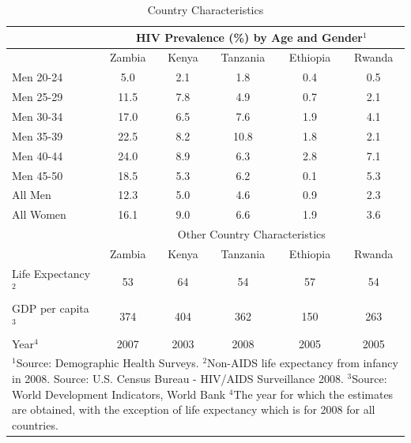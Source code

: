 \documentclass[12pt]{article}
\begin{document}
\begin{table}
\begin{center}
\caption{Country Characteristics}\label{tb:countries}
\vspace*{1pc}
\begin{tabular}{l|ccccc}\hline\hline
 & \multicolumn{5}{c}{HIV Prevalence (\%) by Age and Gender$^{1}$} \\\hline
 & Zambia & Kenya & Tanzania & Ethiopia & Rwanda \\\hline
Men 20-24 & 5.0   & 2.1  & 1.8  & 0.4  & 0.5  \\
Men 25-29 & 11.5  & 7.8  & 4.9  & 0.7  & 2.1  \\
Men 30-34 & 17.0  & 6.5  & 7.6  & 1.9  & 4.1  \\
Men 35-39 & 22.5  & 8.2  & 10.8 & 1.8  & 2.1  \\
Men 40-44 & 24.0  & 8.9  & 6.3  & 2.8  & 7.1  \\
Men 45-50 & 18.5  & 5.3  & 6.2  & 0.1  & 5.3  \\
All Men   & 12.3  & 5.0  & 4.6  & 0.9  & 2.3  \\
All Women & 16.1  & 9.0  & 6.6  & 1.9  & 3.6  \\ \hline\hline
 & \multicolumn{5}{c}{Other Country Characteristics} \\\hline
 & Zambia & Kenya & Tanzania & Ethiopia & Rwanda \\\hline
Life Expectancy$^{2}$ & 53 & 64 & 54 & 57 & 54 \\
GDP per capita$^{3}$ & 374 & 404 & 362 & 150 & 263 \\ \hline\hline
Year$^{4}$ & 2007 & 2003 & 2008 & 2005 & 2005 \\ \hline \hline
\multicolumn{6}{p{5in}}{
\footnotesize{$^{1}$Source: Demographic Health Surveys.}\newline
\footnotesize{$^{2}$Non-AIDS life expectancy from infancy in 2008. Source: U.S. Census Bureau - HIV/AIDS Surveillance 2008.}\newline
\footnotesize{$^{3}$Source: World Development Indicators, World Bank}\newline
\footnotesize{$^{4}$The year for which the estimates are obtained, with the exception of life expectancy which is for 2008 for all countries.}
}

\end{tabular}
\end{center}
\end{table}
\end{document}
